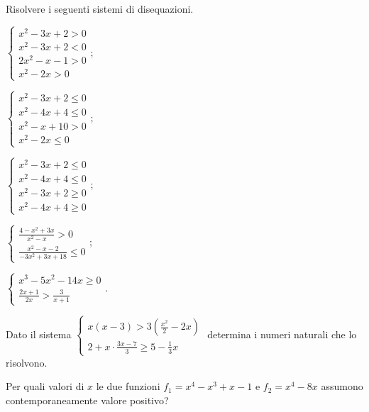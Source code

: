 \begin{esercizio}[\Ast]
 \label{ese:4.81}
Risolvere i seguenti sistemi di disequazioni.
\begin{multicols}{2}
\begin{enumeratea}
\item $\left\{\begin{array}{l}x^2-3x+2>0\\x^2-3x+2<0\\2x^2-x-1>0\\x^2-2x>0 \end{array}\right.$;
\item $\left\{\begin{array}{l}x^2-3x+2\le 0\\x^2-4x+4\le 0\\x^2-x+10>0\\x^2-2x\le 0 \end{array}\right.$;
\item $\left\{\begin{array}{l}x^2-3x+2\le 0\\x^2-4x+4\le 0\\x^2-3x+2\ge 0\\x^2-4x+4\ge 0\end{array}\right.$;
\item $\left\{\begin{array}{l}{\frac{4-x^2+3x}{x^2-x}>0}\\{\frac{x^2-x-2}{-3x^2+3x+18}\le 0}\end{array}\right.$;
\item $\left\{\begin{array}{l}x^3-5x^2-14x\ge 0\\ \frac{2x+1}{2x}>\frac 3{x+1}\end{array}\right.$.
\end{enumeratea}
\end{multicols}
\end{esercizio}

\begin{esercizio}[\Ast]
\label{ese:4.82}
Dato il sistema $\left\{\begin{array}{l}{x(x-3)>3\left(\frac{x^2} 2-2x\right)}\\{2+x\cdot \frac{3x-7} 3\ge 5-\frac 1 3x}\end{array}\right.$ determina i numeri naturali che lo risolvono.
\end{esercizio}

\begin{esercizio}[\Ast]
 \label{ese:4.83}
Per quali valori di $ x $ le due funzioni $f_1=x^4-x^3+x-1$ e $f_2=x^4-8x$ assumono contemporaneamente valore positivo?
\end{esercizio}


